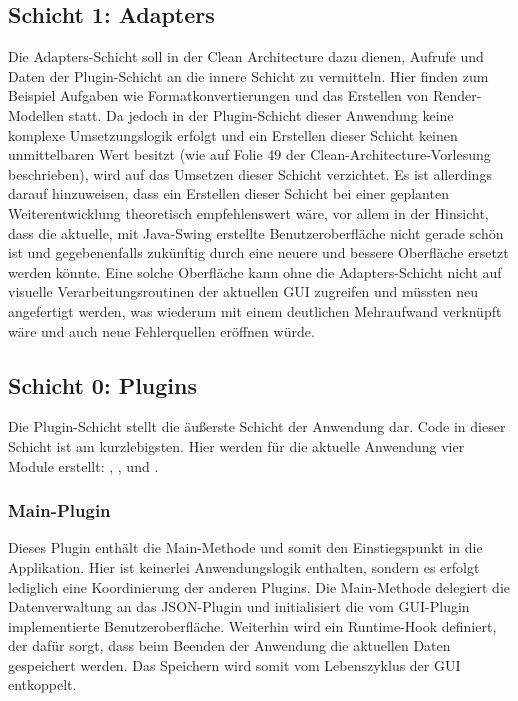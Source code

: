 \subsection{Schicht 1: Adapters}
Die Adapters-Schicht soll in der Clean Architecture dazu dienen, Aufrufe und Daten der Plugin-Schicht an die innere Schicht zu vermitteln.
Hier finden zum Beispiel Aufgaben wie Formatkonvertierungen und das Erstellen von Render-Modellen statt.
Da jedoch in der Plugin-Schicht dieser Anwendung keine komplexe Umsetzungslogik erfolgt und ein Erstellen dieser Schicht keinen unmittelbaren Wert besitzt (wie auf Folie 49 der Clean-Architecture-Vorlesung beschrieben), wird auf das Umsetzen dieser Schicht verzichtet.
Es ist allerdings darauf hinzuweisen, dass ein Erstellen dieser Schicht bei einer geplanten Weiterentwicklung theoretisch empfehlenswert wäre, vor allem in der Hinsicht, dass die aktuelle, mit Java-Swing erstellte Benutzeroberfläche nicht gerade schön ist und gegebenenfalls zukünftig durch eine neuere und bessere Oberfläche ersetzt werden könnte.
Eine solche Oberfläche kann ohne die Adapters-Schicht nicht auf visuelle Verarbeitungsroutinen der aktuellen GUI zugreifen und müssten neu angefertigt werden, was wiederum mit einem deutlichen Mehraufwand verknüpft wäre und auch neue Fehlerquellen eröffnen würde.

\subsection{Schicht 0: Plugins}
Die Plugin-Schicht stellt die äußerste Schicht der Anwendung dar.
Code in dieser Schicht ist am kurzlebigsten.
Hier werden für die aktuelle Anwendung vier Module erstellt: \href{https://github.com/yschiebelhut/carpool-java/tree/b572f3aabe01f91462d00f1469b7c1da3266873b/0-carpool-java-plugin-main}{}, \href{https://github.com/yschiebelhut/carpool-java/tree/b572f3aabe01f91462d00f1469b7c1da3266873b/0-carpool-java-plugin-ui}{}, \href{https://github.com/yschiebelhut/carpool-java/tree/b572f3aabe01f91462d00f1469b7c1da3266873b/0-carpool-java-plugin-json}{} und \href{https://github.com/yschiebelhut/carpool-java/tree/b572f3aabe01f91462d00f1469b7c1da3266873b/0-carpool-java-integration}{}.

\subsubsection{Main-Plugin}
Dieses Plugin enthält die Main-Methode und somit den Einstiegspunkt in die Applikation.
Hier ist keinerlei Anwendungslogik enthalten, sondern es erfolgt lediglich eine Koordinierung der anderen Plugins.
Die Main-Methode delegiert die Datenverwaltung an das JSON-Plugin und initialisiert die vom GUI-Plugin implementierte Benutzeroberfläche.
Weiterhin wird ein Runtime-Hook definiert, der dafür sorgt, dass beim Beenden der Anwendung die aktuellen Daten gespeichert werden.
Das Speichern wird somit vom Lebenszyklus der GUI entkoppelt.

